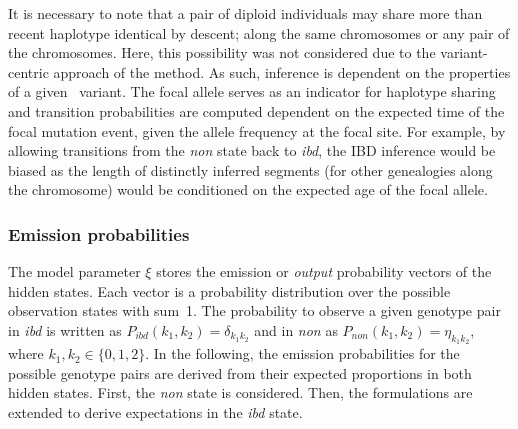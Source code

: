 %

%

It is necessary to note that a pair of diploid individuals may share more than  recent haplotype identical by descent; \eg along the same  chromosomes or any pair of the  chromosomes.
Here, this possibility was not considered due to the variant-centric approach of the method.
As such, inference is dependent on the properties of a given \fk{}~variant.
The focal allele serves as an indicator for haplotype sharing and transition probabilities are computed dependent on the expected time of the focal mutation event, given the allele frequency at the focal site.
For example, by allowing transitions from the \emph{non} state back to \emph{ibd},
the IBD inference would be biased as the length of distinctly inferred segments (\ie for other genealogies along the chromosome) would be conditioned on the expected age of the focal allele.


%
\subsubsection{Emission probabilities}
\label{sec:HmmEmiss}
%

The model parameter $\xi$ stores the emission or \emph{output} probability vectors of the hidden states.
Each vector is a probability distribution over the possible observation states with sum~1.
The probability to observe a given genotype pair in \emph{ibd} is written as ${P_\textit{ibd}(k_1,k_2) = \delta_{k_1 k_2}}$ and in \emph{non} as ${P_\textit{non}(k_1,k_2) = \eta_{k_1 k_2}}$, where ${k_1,k_2 \in \{0,1,2\}}$.
In the following, the emission probabilities for the possible genotype pairs are derived from their expected proportions in both hidden states.
First, the \emph{non} state is considered.
Then, the formulations are extended to derive expectations in the \emph{ibd} state.

